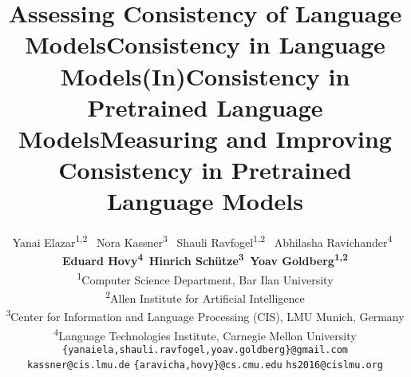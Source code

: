 \documentclass[11pt]{article}
\title{Assessing Consistency of Language Models}
\title{Consistency in Language Models}
\title{(In)Consistency in Pretrained Language Models}
\title{Measuring and Improving Consistency in Pretrained Language Models}
\author{Yanai Elazar\textsuperscript{1,2} \,
 Nora Kassner\textsuperscript{3} \,
 Shauli Ravfogel\textsuperscript{1,2} \, 
 Abhilasha Ravichander\textsuperscript{4} \, \\
 {\bf Eduard Hovy\textsuperscript{4}\, 
 \bf Hinrich Sch\"utze\textsuperscript{3}\, 
 Yoav Goldberg\textsuperscript{1,2}}\\
\textsuperscript{1}Computer Science Department, Bar Ilan University \\
\textsuperscript{2}Allen Institute for Artificial Intelligence \\
\textsuperscript{3}Center for Information and Language Processing (CIS), LMU Munich, Germany\\
\textsuperscript{4}Language Technologies Institute, Carnegie Mellon University \\
  {\tt  \{yanaiela,shauli.ravfogel,yoav.goldberg\}@gmail.com}\\
  {\tt kassner@cis.lmu.de} 
  {\tt \{aravicha,hovy\}@cs.cmu.edu} 
  {\tt hs2016@cislmu.org}
  }
\begin{document}
\maketitle
\begin{abstract}

\end{abstract}


% 












% 









% 

% 










\end{document}
